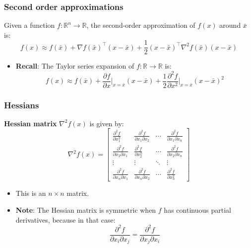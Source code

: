     \subsubsection{Second order approximations}
    \begin{definition}
        Given a function $f: \mathbb{R}^n \to \mathbb{R}$, the second-order approximation of $f(x)$ around $\bar{x}$ is:
        \begin{equation}
            f(x) \approx f(\bar{x}) + \nabla f(\bar{x})^\top (x - \bar{x}) + \frac{1}{2} (x - \bar{x})^\top \nabla^2 f(\bar{x}) (x - \bar{x})
        \end{equation}
        \begin{itemize}
            \item \textbf{Recall}: The Taylor series expansion of $f: \mathbb{R} \to \mathbb{R}$ is:
            \[
            f(x) \approx f(\bar{x}) + \frac{\partial f}{\partial x} \bigg|_{x = \bar{x}} (x - \bar{x}) + \frac{1}{2} \frac{\partial^2 f}{\partial x^2} \bigg|_{x = \bar{x}} (x - \bar{x})^2
            \]
        \end{itemize}
    \end{definition}

    \subsubsection{Hessians}
    \begin{definition}
        \textbf{Hessian matrix} $\nabla^2 f(x)$ is given by:
            \begin{equation}
                \nabla^2 f(x) = 
                \begin{bmatrix}
                    \frac{\partial^2 f}{\partial x_1^2} & \frac{\partial^2 f}{\partial x_1 \partial x_2} & \cdots & \frac{\partial^2 f}{\partial x_1 \partial x_n} \\
                    \frac{\partial^2 f}{\partial x_2 \partial x_1} & \frac{\partial^2 f}{\partial x_2^2} & \cdots & \frac{\partial^2 f}{\partial x_2 \partial x_n} \\
                    \vdots & \vdots & \ddots & \vdots \\
                    \frac{\partial^2 f}{\partial x_n \partial x_1} & \frac{\partial^2 f}{\partial x_n \partial x_2} & \cdots & \frac{\partial^2 f}{\partial x_n^2}
                \end{bmatrix}
            \end{equation}
            \begin{itemize}
                \item This is an $n \times n$ matrix.
                \item \textbf{Note}: The Hessian matrix is symmetric when $f$ has continuous partial derivatives, because in that case:
                \[
                \frac{\partial^2 f}{\partial x_i \partial x_j} = \frac{\partial^2 f}{\partial x_j \partial x_i}
                \]    
            \end{itemize}
    \end{definition}

